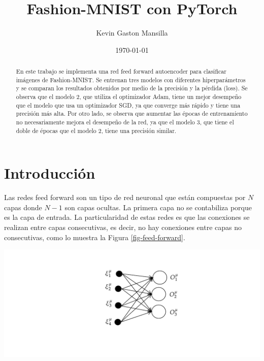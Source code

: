 \documentclass[aps,prl,reprint,groupedaddress]{revtex4-2}
\newenvironment{Figura}
  {\par\medskip\noindent\minipage{\linewidth}}
  {\endminipage\par\medskip}
\begin{document}
\title{
Fashion-MNIST con PyTorch
}

\author{Kevin Gaston Mansilla}

\affiliation{}

\date{\today}

\begin{abstract}
En este trabajo se implementa una red feed forward autoencoder para clasificar
imágenes de Fashion-MNIST. Se entrenan tres modelos con diferentes hiperparámetros
y se comparan los resultados obtenidos por medio de la precisión y la 
pérdida (loss). Se observa que el modelo 2, que utiliza el optimizador Adam, 
tiene un mejor desempeño que el modelo que usa un optimizador SGD, ya que
converge más rápido y tiene una precisión más alta. Por otro lado, se observa que
aumentar las épocas de entrenamiento no necesariamente mejora el desempeño de la
red, ya que el modelo 3, que tiene el doble de épocas que el modelo 2, tiene una
precisión similar.
\end{abstract}


\maketitle

\section{Introducción}
Las redes feed forward son un tipo de red neuronal que están compuestas por 
$N$ capas donde $N-1$ son capas ocultas. La primera capa no se contabiliza 
porque es la capa de entrada. La particularidad de estas redes es que las 
conexiones se realizan entre capas consecutivas, es decir, no hay conexiones
entre capas no consecutivas, como lo muestra la Figura \ref{fig-feed-forward}.
\begin{Figura}
  \centering
  \includegraphics[width=1\textwidth]{figs/red-feed-forward.pdf}
  \label{fig-feed-forward}
\end{Figura}
\end{document}
